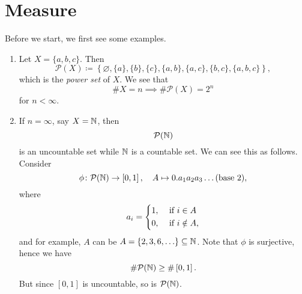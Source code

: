 \section{Measure}\label{sec:Measure}
\begin{eg}
	Before we start, we first see some examples.
	\begin{enumerate}
		\item Let \(X = \{a, b, c\}\). Then
		      \[
			      \mathcal{P}(X)\coloneqq \left\{\varnothing , \{a\}, \{b\}, \{c\}, \{a, b\}, \{a, c\}, \{b, c\}, \{a, b, c\}\right\},
		      \]
		      which is the \emph{power set} of \(X\). We see that
		      \[
			      \# X = n \implies \# \mathcal{P}(X) = 2^n
		      \]
		      for \(n< \infty\).
		\item If \(n = \infty\), say \(X = \mathbb{\MakeUppercase{N}} \), then
		      \[
			      \mathcal{P} (\mathbb{\MakeUppercase{N}} )
		      \]
		      is an uncountable set while \(\mathbb{\MakeUppercase{N}}\) is a countable set. We can see this as follows. Consider
		      \[
			      \phi\colon \mathcal{P}(\mathbb{\MakeUppercase{N}}) \to \left[0, 1\right],\quad A\mapsto 0.a_1 a_2 a_3 \ldots (\text{base }2),
		      \]
		      where
		      \[
			      a_i = \begin{dcases}
				      1, & \text{ if } i\in A     \\
				      0, & \text{ if } i\notin A,
			      \end{dcases}
		      \]
		      and for example, \(A\) can be
		      \(A = \{2, 3, 6, \ldots  \}\subseteq \mathbb{\MakeUppercase{N}}\). Note that \(\phi\) is surjective, hence we have
		      \[
			      \# \mathcal{P}(\mathbb{\MakeUppercase{N}} ) \geq \#\left[0, 1\right].
		      \]
		      But since \(\left[0, 1\right]\) is uncountable, so is \(\mathcal{P} (\mathbb{\MakeUppercase{N}} )\).
	\end{enumerate}
\end{eg}

